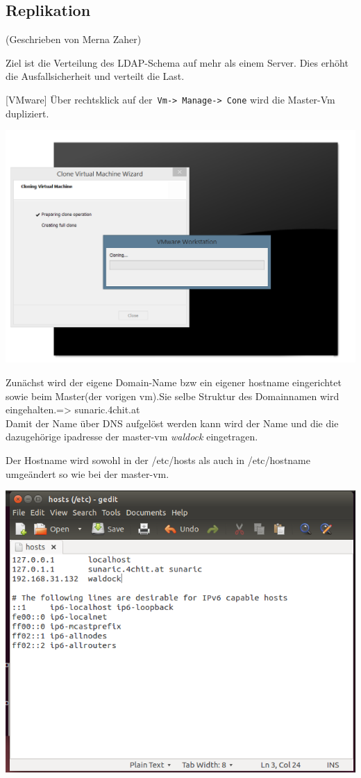 
\subsection{Replikation}
(Geschrieben von Merna Zaher)

Ziel ist die Verteilung des LDAP-Schema auf mehr als einem Server. Dies erhöht die Ausfallsicherheit und verteilt die Last.
 

[VMware] Über rechtsklick auf der\verb| Vm-> Manage-> Cone| wird die Master-Vm dupliziert.


\begin{center}
	\includegraphics[width=0.75\linewidth]{images/a4_clonevirtualmachine.PNG}
\end{center}

Zunächst wird der eigene Domain-Name bzw ein eigener hostname eingerichtet sowie beim Master(der vorigen vm).Sie selbe Struktur des Domainnamen wird eingehalten.=> sunaric.4chit.at\\
Damit der Name über DNS aufgelöst werden kann wird der Name und die die dazugehörige ipadresse der master-vm \textit{waldock} eingetragen.

Der Hostname wird sowohl in der /etc/hosts als auch in /etc/hostname umgeändert so wie bei der  master-vm.
\begin{center}
	\includegraphics[width=1.0\linewidth]{images/a5_addmasterdns.PNG}
\end{center}


